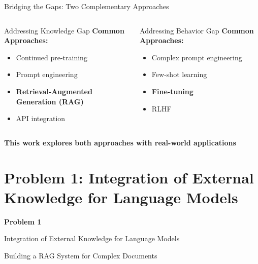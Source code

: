 \documentclass[11pt, aspectratio=169, xcolor=table]{beamer}
\begin{document}
\begin{frame}{Bridging the Gaps: Two Complementary Approaches}
    \begin{columns}[T]
        \begin{block}{Addressing Knowledge Gap}
            \textbf{Common Approaches:}
            \begin{itemize}
                \item Continued pre-training
                \item Prompt engineering
                \item \textbf{\color{MainNavy}Retrieval-Augmented Generation (RAG)} 
                \item API integration
            \end{itemize} 
        \end{block}

        \begin{block}{Addressing Behavior Gap}
            \textbf{Common Approaches:}
            \begin{itemize}
                \item Complex prompt engineering
                \item Few-shot learning
                \item \textbf{\color{MainNavy}Fine-tuning}
                \item RLHF
            \end{itemize}  
        \end{block}
    \end{columns}
    
    \vspace{0.4cm}
    \begin{center}
        \textbf{\color{MainNavy}This work explores both approaches with real-world applications}
    \end{center}
\end{frame}

\section{Problem 1: Integration of External Knowledge for Language Models}

\begin{frame}[plain]
    \begin{center}
        \vfill
        {\Huge\color{MainNavy}\textbf{Problem 1}}
        \vspace{0.5cm}
        
        {\Large Integration of External Knowledge for Language Models}
        \vspace{0.3cm}
        
        {\large Building a RAG System for Complex Documents}
        \vfill
    \end{center}
\end{frame}
\end{document}
